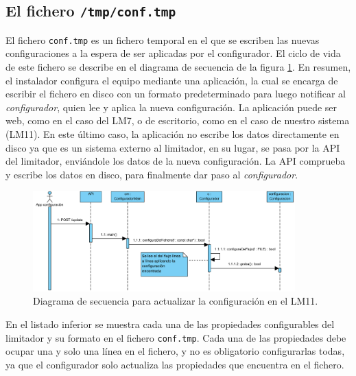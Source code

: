 
\subsection{El fichero \texttt{/tmp/conf.tmp}} \label{append:F_conf.tmp}

El fichero \verb|conf.tmp| es un fichero temporal en el que se escriben las nuevas configuraciones a la espera de ser aplicadas por el configurador. El ciclo de vida de este fichero se describe en el diagrama de secuencia de la figura \ref{fig:lms11-conf.tmp}. En resumen, el instalador configura el equipo mediante una aplicación, la cual se encarga de escribir el fichero en disco con un formato predeterminado para luego notificar al \textit{configurador}, quien lee y aplica la nueva configuración. La aplicación puede ser web, como en el caso del LM7, o de escritorio, como en el caso de nuestro sistema (LM11). En este último caso, la aplicación no escribe los datos directamente en disco ya que es un sistema externo al limitador, en su lugar, se pasa por la API del limitador, enviándole los datos de la nueva configuración. La API comprueba y escribe los datos en disco, para finalmente dar paso al \textit{configurador}.

\begin{figure}[h]
	\centering
    \includegraphics[width=0.9\textwidth]{figuras/lms11-conf.tmp.pdf}
    \caption{Diagrama de secuencia para actualizar la configuración en el LM11.}
    \label{fig:lms11-conf.tmp}
\end{figure}

En el listado inferior se muestra cada una de las propiedades configurables del limitador y su formato en el fichero  \verb|conf.tmp|. Cada una de las propiedades debe ocupar una y solo una línea en el fichero, y no es obligatorio configurarlas todas, ya que el configurador solo actualiza las propiedades que encuentra en el fichero.

